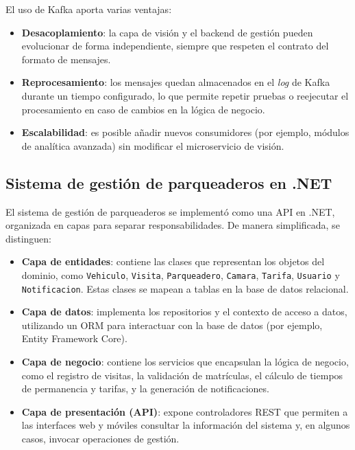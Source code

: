 El uso de Kafka aporta varias ventajas:

\begin{itemize}
    \item \textbf{Desacoplamiento}: la capa de visión y el backend de gestión pueden evolucionar de forma independiente, siempre que respeten el contrato del formato de mensajes.
    \item \textbf{Reprocesamiento}: los mensajes quedan almacenados en el \textit{log} de Kafka durante un tiempo configurado, lo que permite repetir pruebas o reejecutar el procesamiento en caso de cambios en la lógica de negocio.
    \item \textbf{Escalabilidad}: es posible añadir nuevos consumidores (por ejemplo, módulos de analítica avanzada) sin modificar el microservicio de visión.
\end{itemize}

\subsection{Sistema de gestión de parqueaderos en .NET}

El sistema de gestión de parqueaderos se implementó como una API en .NET, organizada en capas para separar responsabilidades. De manera simplificada, se distinguen:

\begin{itemize}
    \item \textbf{Capa de entidades}: contiene las clases que representan los objetos del dominio, como \texttt{Vehiculo}, \texttt{Visita}, \texttt{Parqueadero}, \texttt{Camara}, \texttt{Tarifa}, \texttt{Usuario} y \texttt{Notificacion}. Estas clases se mapean a tablas en la base de datos relacional.
    \item \textbf{Capa de datos}: implementa los repositorios y el contexto de acceso a datos, utilizando un ORM para interactuar con la base de datos (por ejemplo, Entity Framework Core).
    \item \textbf{Capa de negocio}: contiene los servicios que encapsulan la lógica de negocio, como el registro de visitas, la validación de matrículas, el cálculo de tiempos de permanencia y tarifas, y la generación de notificaciones.
    \item \textbf{Capa de presentación (API)}: expone controladores REST que permiten a las interfaces web y móviles consultar la información del sistema y, en algunos casos, invocar operaciones de gestión.
\end{itemize}


